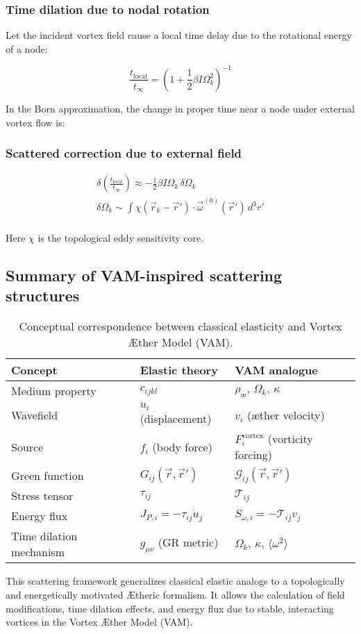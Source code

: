 \subsubsection*{Time dilation due to nodal rotation}

Let the incident vortex field cause a local time delay due to the rotational energy of a node:

\[
    \frac{t_\text{local}}{t_{\infty}} = \left(1 + \frac{1}{2} \beta I \Omega_k^2 \right)^{-1}
\]

In the Born approximation, the change in proper time near a node under external vortex flow is:

\subsubsection*{Scattered correction due to external field}

\begin{gather*}
    \delta \left( \frac{t_\text{local}}{t_{\infty}} \right) \approx - \frac{1}{2} \beta I \Omega_k \, \delta \Omega_k\\
    \delta \Omega_k \sim \int \chi(\vec{r}_k - \vec{r}') \cdot \vec{\omega}^{(0)}(\vec{r}') \, d^3r'\\
\end{gather*}


Here \(\chi\) is the topological eddy sensitivity core.
\subsection{Summary of VAM-inspired scattering structures}

\begin{table}[htbp]
    \centering
    \begin{tabular}{lll}
        \toprule
    \textbf{Concept} & \textbf{Elastic theory} & \textbf{VAM analogue} \\
    \midrule
    Medium property & \( c_{ijkl} \) & \( \rho_\text{\ae},\, \Omega_k,\, \kappa \) \\
    Wavefield & \( u_i \) (displacement) & \( v_i \) (æther velocity) \\
    Source & \( f_i \) (body force) & \( F_i^\text{vortex} \) (vorticity forcing) \\
    Green function & \( G_{ij}(\vec{r}, \vec{r}') \) & \( \mathcal{G}_{ij}(\vec{r}, \vec{r}') \) \\
    Stress tensor & \( \tau_{ij} \) & \( \mathcal{T}_{ij} \) \\
    Energy flux & \( J_{P,i} = -\tau_{ij} \dot{u}_j \) & \( S_{\omega,i} = -\mathcal{T}_{ij} v_j \) \\
    Time dilation mechanism & \( g_{\mu\nu} \) (GR metric) & \( \Omega_k,\, \kappa,\, \langle \omega^2 \rangle \) \\
    \bottomrule
    \end{tabular}
    \caption{Conceptual correspondence between classical elasticity and Vortex Æther Model (VAM).}
    \label{tab:elastic-vam-analogy}
\end{table}

This scattering framework generalizes classical elastic analogs to a topologically and energetically motivated Ætheric formalism. It allows the calculation of field modifications, time dilation effects, and energy flux due to stable, interacting vortices in the Vortex Æther Model (VAM).